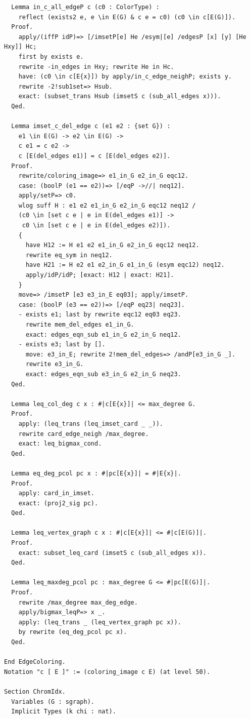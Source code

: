 \begin{verbatim}
  Lemma in_c_all_edgeP c (c0 : ColorType) :
    reflect (exists2 e, e \in E(G) & c e = c0) (c0 \in c[E(G)]).
  Proof.
    apply/(iffP idP)=> [/imsetP[e] He /esym|[e] /edgesP [x] [y] [He Hxy]] Hc; 
    first by exists e.
    rewrite -in_edges in Hxy; rewrite He in Hc.
    have: (c0 \in c[E{x}]) by apply/in_c_edge_neighP; exists y.
    rewrite -2!sub1set=> Hsub. 
    exact: (subset_trans Hsub (imsetS c (sub_all_edges x))).
  Qed.

  Lemma imset_c_del_edge c (e1 e2 : {set G}) :
    e1 \in E(G) -> e2 \in E(G) ->
    c e1 = c e2 -> 
    c [E(del_edges e1)] = c [E(del_edges e2)].
  Proof.
    rewrite/coloring_image=> e1_in_G e2_in_G eqc12.
    case: (boolP (e1 == e2))=> [/eqP ->//| neq12].
    apply/setP=> c0.
    wlog suff H : e1 e2 e1_in_G e2_in_G eqc12 neq12 /
    (c0 \in [set c e | e in E(del_edges e1)] ->
     c0 \in [set c e | e in E(del_edges e2)]).
    { 
      have H12 := H e1 e2 e1_in_G e2_in_G eqc12 neq12.
      rewrite eq_sym in neq12.
      have H21 := H e2 e1 e2_in_G e1_in_G (esym eqc12) neq12.
      apply/idP/idP; [exact: H12 | exact: H21].
    }
    move=> /imsetP [e3 e3_in_E eq03]; apply/imsetP.
    case: (boolP (e3 == e2))=> [/eqP eq23| neq23].
    - exists e1; last by rewrite eqc12 eq03 eq23.
      rewrite mem_del_edges e1_in_G.
      exact: edges_eqn_sub e1_in_G e2_in_G neq12.
    - exists e3; last by [].
      move: e3_in_E; rewrite 2!mem_del_edges=> /andP[e3_in_G _].
      rewrite e3_in_G.
      exact: edges_eqn_sub e3_in_G e2_in_G neq23.
  Qed. 

  Lemma leq_col_deg c x : #|c[E{x}]| <= max_degree G.
  Proof. 
    apply: (leq_trans (leq_imset_card _ _)).
    rewrite card_edge_neigh /max_degree.
    exact: leq_bigmax_cond.
  Qed.

  Lemma eq_deg_pcol pc x : #|pc[E{x}]| = #|E{x}|.
  Proof.
    apply: card_in_imset.
    exact: (proj2_sig pc). 
  Qed.

  Lemma leq_vertex_graph c x : #|c[E{x}]| <= #|c[E(G)]|.
  Proof.
    exact: subset_leq_card (imsetS c (sub_all_edges x)).
  Qed.

  Lemma leq_maxdeg_pcol pc : max_degree G <= #|pc[E(G)]|.
  Proof.
    rewrite /max_degree max_deg_edge.
    apply/bigmax_leqP=> x _. 
    apply: (leq_trans _ (leq_vertex_graph pc x)).
    by rewrite (eq_deg_pcol pc x).
  Qed.

End EdgeColoring.
Notation "c [ E ]" := (coloring_image c E) (at level 50).

Section ChromIdx.
  Variables (G : sgraph).
  Implicit Types (k chi : nat).
  

\end{verbatim}
